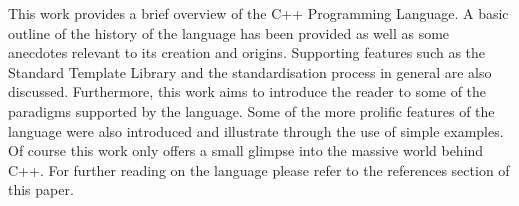 \documentclass[conference, a4paper]{IEEEtran}
\begin{document}
This work provides a brief overview of the C++ Programming Language. A basic outline of the history of the language has been provided as well as some anecdotes relevant to its creation and origins. Supporting features such as the Standard Template Library and the standardisation process in general are also discussed. Furthermore, this work aims to introduce the reader to some of the paradigms supported by the language. Some of the more prolific features of the language were also introduced and illustrate through the use of simple examples. Of course this work only offers a small glimpse into the massive world behind C++. For further reading on the language please refer to the references section of this paper.




\phantom{\cite{*}}

\end{document}

